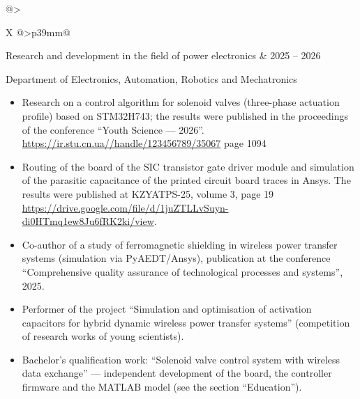 \documentclass[11pt,a4paper]{article}
\makeatletter
\newcommand{\heading}[1]{%
  \par\vspace{10pt}%
  \noindent{\color{head}\bfseries\fontsize{13}{15}\selectfont #1}%
  \par\vspace{1pt}%
  \noindent{\color{head}\rule{\linewidth}{0.9pt}}%
  \par\vspace{3pt}%
}
\newcommand{\entry}[2]{%
  \par\vspace{5pt}%
  \noindent\begin{tabularx}{\linewidth}{@{}>{\raggedright\arraybackslash\bfseries}X @{\hspace{8pt}}>{\raggedleft\arraybackslash\itshape}p{39mm}@{}}
    #1 & #2
  \end{tabularx}%
  \par\vspace{1pt}%
}
\newcommand{\org}[1]{{\itshape\raggedright #1\par}\vspace{2pt}}
\newenvironment{points}
  {\begin{itemize}[leftmargin=14pt, itemsep=1.5pt, topsep=2pt, parsep=0pt,
                   label=\textbullet]}
  {\end{itemize}}
\makeatother
\begin{document}
\entry{Research and development in the field of power electronics}{2025 -- 2026}
\org{Department of Electronics, Automation, Robotics and Mechatronics}
\begin{points}
  \item Research on a control algorithm for solenoid valves (three-phase actuation profile) based on
        STM32H743; the results were published in the proceedings of the conference
        “Youth Science --- 2026”. \url{https://ir.stu.cn.ua//handle/123456789/35067} page 1094
  \item Routing of the board of the SIC transistor gate driver module and simulation of the parasitic
        capacitance of the printed circuit board traces in Ansys. The results were published at
        KZYATPS-25, volume 3, page 19
        \url{https://drive.google.com/file/d/1juZTLLvSuyn-di0HTmq1ew8Ju6fRK2ki/view}.
  \item Co-author of a study of ferromagnetic shielding in wireless power transfer systems
        (simulation via PyAEDT/Ansys), publication at the conference “Comprehensive quality
        assurance of technological processes and systems”, 2025.
  \item Performer of the project “Simulation and optimisation of activation capacitors for hybrid
        dynamic wireless power transfer systems” (competition of research works of young scientists).
  \item Bachelor's qualification work: “Solenoid valve control system with wireless data exchange”
        --- independent development of the board, the controller firmware and the MATLAB model
        (see the section “Education”).
\end{points}

\heading{Publications}
\end{document}

